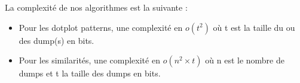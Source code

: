 La complexité de nos algorithmes est la suivante :

\begin{itemize}
  \item Pour les dotplot patterns, une complexité en $o(t^{2})$ où t est la taille du ou des dump(s) en bits.
  \item Pour les similarités, une complexité en $o(n^{2}\times t)$ où n est le nombre de dumps et t la taille des dumps en bits.
\end{itemize}
